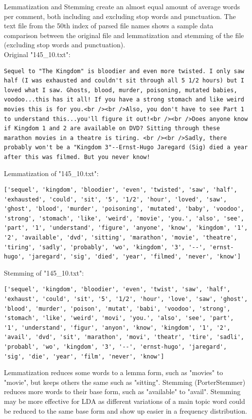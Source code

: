 \documentclass[conference]{IEEEtran}
\begin{document}
\begin{enumerate}
    Lemmatization and Stemming create an almost equal amount of average words per comment, both including and excluding stop words and punctuation. The text file from the 50th index of parsed file names shows a sample data comparison between the original file and lemmatization and stemming of the file (excluding stop words and punctuation).\\
    Original "145\_10.txt":
    \begin{lstlisting}
Sequel to "The Kingdom" is bloodier and even more twisted. I only saw half (I was exhausted and couldn't sit through all 5 1/2 hours) but I loved what I saw. Ghosts, blood, murder, poisoning, mutated babies, voodoo...this has it all! If you have a strong stomach and like weird movies this is for you.<br /><br />Also, you don't have to see Part 1 to understand this...you'll figure it out!<br /><br />Does anyone know if Kingdom 1 and 2 are available on DVD? Sitting through these marathon movies in a theatre is tiring. <br /><br />Sadly, there probably won't be a "Kingdom 3"--Ernst-Hugo Jaregard (Sig) died a year after this was filmed. But you never know!
    \end{lstlisting}
    Lemmatization of "145\_10.txt":
    \begin{lstlisting}
['sequel', 'kingdom', 'bloodier', 'even', 'twisted', 'saw', 'half', 'exhausted', 'could', 'sit', '5', '1/2', 'hour', 'loved', 'saw', 'ghost', 'blood', 'murder', 'poisoning', 'mutated', 'baby', 'voodoo', 'strong', 'stomach', 'like', 'weird', 'movie', 'you.', 'also', 'see', 'part', '1', 'understand', 'figure', 'anyone', 'know', 'kingdom', '1', '2', 'available', 'dvd', 'sitting', 'marathon', 'movie', 'theatre', 'tiring', 'sadly', 'probably', 'wo', 'kingdom', '3', '--', 'ernst-hugo', 'jaregard', 'sig', 'died', 'year', 'filmed', 'never', 'know']
    \end{lstlisting}
    Stemming of "145\_10.txt":
	\begin{lstlisting}
['sequel', 'kingdom', 'bloodier', 'even', 'twist', 'saw', 'half', 'exhaust', 'could', 'sit', '5', '1/2', 'hour', 'love', 'saw', 'ghost', 'blood', 'murder', 'poison', 'mutat', 'babi', 'voodoo', 'strong', 'stomach', 'like', 'weird', 'movi', 'you.', 'also', 'see', 'part', '1', 'understand', 'figur', 'anyon', 'know', 'kingdom', '1', '2', 'avail', 'dvd', 'sit', 'marathon', 'movi', 'theatr', 'tire', 'sadli', 'probabl', 'wo', 'kingdom', '3', '--', 'ernst-hugo', 'jaregard', 'sig', 'die', 'year', 'film', 'never', 'know']
	\end{lstlisting}
Lemmatization reduces some words to a lemma form, such as "movies" to "movie", but keeps others the same such as "sitting". Stemming (PorterStemmer) reduces more words to their base form, such as "available" to "avail". Stemming may be more effective for LDA as different variations of a main topic word could be reduced to the same base form and show up easier in a frequency distribution.
\end{enumerate}
\newpage
\end{document}
